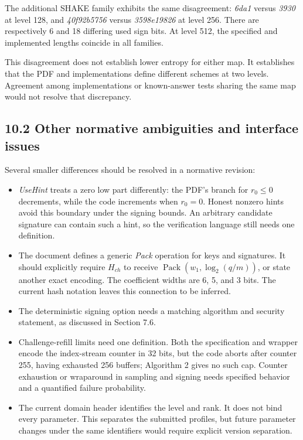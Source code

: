 \documentclass[
  american,
  10pt,
  a4paper,
]{article}
\providecommand{\tightlist}{%
  \setlength{\itemsep}{0pt}\setlength{\parskip}{0pt}}
\begin{document}
The additional SHAKE family exhibits the same disagreement: \emph{6da1}
versus \emph{3930} at level 128, and \emph{40f92b5756} versus
\emph{3598e19826} at level 256. There are respectively 6 and 18
differing used sign bits. At level 512, the specified and implemented
lengths coincide in all families.

This disagreement does not establish lower entropy for either map. It
establishes that the PDF and implementations define different schemes at
two levels. Agreement among implementations or known-answer tests
sharing the same map would not resolve that discrepancy.

\subsection{10.2 Other normative ambiguities and interface
issues}\label{other-normative-ambiguities-and-interface-issues}

Several smaller differences should be resolved in a normative revision:

\begin{itemize}
\tightlist
\item
  \emph{UseHint} treats a zero low part differently: the PDF's branch
  for \(r_0\leq0\) decrements, while the code increments when \(r_0=0\).
  Honest nonzero hints avoid this boundary under the signing bounds. An
  arbitrary candidate signature can contain such a hint, so the
  verification language still needs one definition.
\item
  The document defines a generic \emph{Pack} operation for keys and
  signatures. It should explicitly require \(H_{ch}\) to receive
  \(\operatorname{Pack}(w_1,\log_2(q/m))\), or state another exact
  encoding. The coefficient widths are 6, 5, and 3 bits. The current
  hash notation leaves this connection to be inferred.
\item
  The deterministic signing option needs a matching algorithm and
  security statement, as discussed in Section 7.6.
\item
  Challenge-refill limits need one definition. Both the specification
  and wrapper encode the index-stream counter in 32 bits, but the code
  aborts after counter 255, having exhausted 256 buffers; Algorithm 2
  gives no such cap. Counter exhaustion or wraparound in sampling and
  signing needs specified behavior and a quantified failure probability.
\item
  The current domain header identifies the level and rank. It does not
  bind every parameter. This separates the submitted profiles, but
  future parameter changes under the same identifiers would require
  explicit version separation.
\end{itemize}
\end{document}
